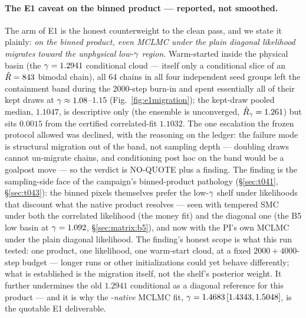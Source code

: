 \paragraph{The E1 caveat on the binned product --- reported, not smoothed.}
The  arm of E1 is the honest counterweight to the clean
 pass, and we state it plainly: \emph{on the binned product,
even MCLMC under the plain diagonal likelihood migrates toward the
unphysical low-$\gamma$ region}. Warm-started inside the physical basin
(the $\gamma=1.2941$ conditional cloud --- itself only a conditional
slice of an $\hat{R}=843$ bimodal chain), all 64 chains in all four
independent seed groups left the containment band during the 2000-step
burn-in and spent essentially all of their kept draws at
$\gamma\approx1.08$--$1.15$
(Fig.~\ref{fig:e1migration}); the kept-draw pooled median, $1.1047$, is
descriptive only (the ensemble is unconverged, $\hat{R}_\gamma=1.261$) but
sits $0.0015$ from the certified correlated-fit $1.1032$. The one
escalation the frozen protocol allowed was declined, with the reasoning on
the ledger: the failure mode is structural migration out of the band, not
sampling depth --- doubling draws cannot un-migrate chains, and
conditioning post hoc on the band would be a goalpost move --- so the
verdict is NO-QUOTE plus a finding. The finding is the sampling-side face
of the campaign's binned-product pathology (\S\ref{sec:t041},
\S\ref{sec:t043}): the binned pixels themselves prefer the low-$\gamma$
shelf under likelihoods that discount what the native product resolves ---
seen with tempered SMC under both the correlated likelihood (the money
fit) and the diagonal one (the B5 low basin at $\gamma=1.092$,
\S\ref{sec:matrix:b5}), and now with the PI's own MCLMC under the plain
diagonal likelihood. The finding's honest scope is what this run tested:
one product, one likelihood, one warm-start cloud, at a fixed
$2000+4000$-step budget --- longer runs or other initializations could
yet behave differently; what is established is the migration itself, not
the shelf's posterior weight. It further
undermines the old $1.2941$ conditional as a diagonal reference for this
product --- and it is why the -\emph{native} MCLMC fit,
$\gamma=1.4683\,[1.4343,1.5048]$, is the quotable E1 deliverable.%

